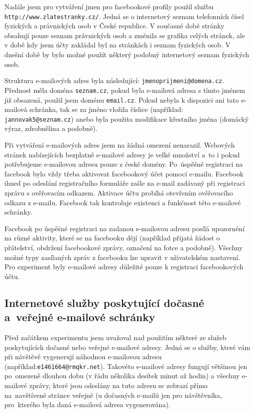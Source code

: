 \documentclass[thesis=M,czech]{FITthesis}[2013/05/10]
\begin{document}
Nadále jsem pro vytváření jmen pro facebookové profily použil službu \verb|http://www.zlatestranky.cz/|. Jedná se o internetový seznam telefonních čísel fyzických a právnických osob v České republice. V současné době stránky obsahují pouze seznam právnických osob a změnila se grafika celých stránek, ale v době kdy jsem účty zakládal byl na stránkách i seznam fyzických osob. V dnešní době by bylo možné použít některý podobný internetový seznam fyzických osob.

Struktura e-mailových adres byla následující: \verb|jmenoprijmeni@domena.cz|. Přednost měla doména \verb|seznam.cz|, pokud byla e-mailová adresa s tímto jménem již obsazená, použil jsem doménu \verb|email.cz|. Pokud nebyla k dispozici ani tato e-mailová schránka, tak se za jméno vložila číslice (například: \verb|jannovak5@seznam.cz|) anebo byla použita modifikace křestního jména (domácký výraz, zdrobnělina a podobně).

Při vytváření e-mailových adres jsem na žádná omezení nenarazil. Webových stránek nabízejících bezplatně e-mailové adresy je velké množství a~to i pokud potřebujeme e-mailovou adresu pouze z české domény. Po~úspěšné registraci na facebook bylo vždy třeba aktivovat facebookový účet pomocí e-mailu. Facebook ihned po odeslání registračního formuláře zašle na e-mail zadávaný při registraci zprávu s ověřovacím odkazem. Aktivace účtu probíhá otevřením ověřovacího odkazu z e-mailu. Facebook tak kontroluje existenci a funkčnost této e-mailové schránky.

Facebook po úspěšné registraci na zadanou e-mailovou adresu posílá upozornění na různé aktivity, které se na facebooku dějí (například přijatá žádost o přátelství, obdržení facebookové zprávy, označení na fotce a podobně). Všechny možné typy zasílaných zpráv z facebooku lze upravit v uživatelském nastavení. Pro experiment byly e-mailové adresy důležité pouze k registraci facebookových účtu.

\subsection{Internetové služby poskytující dočasné a~veřejné e-mailové schránky}

Před začátkem experimentu jsem uvažoval nad použitím některé ze služeb poskytujících dočasné nebo veřejné e-mailové adresy. Jedná se o služby, které vám při návštěvě vygenerují náhodnou e-mailovou adresu (například:\newline \verb|e1461664@rmqkr.net|). Takovéto e-mailové adresy fungují většinou jen po~omezeně dlouhou dobu (v řádu několika desítek minut až hodin) a všechny e-mailové zprávy, které jsou odeslány na tuto adresu se zobrazí přímo na~navštívené stránce veřejně (u dočasných e-mailů jen pro návštěvníka, pro~kterého byla daná e-mailová adresa vygenerována).
\end{document}
